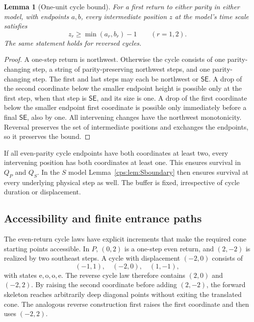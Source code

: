 \documentclass[11pt,letterpaper]{article}
\numberwithin{equation}{section}
\newtheorem{lemma}[theorem]{Lemma}
\theoremstyle{remark}\newtheorem{remark}[theorem]{Remark}
\newcommand{\SE}{\mathsf{SE}}
\newcommand{\e}{\mathrm e}
\newcommand{\oState}{\mathrm o}
\begin{document}
\begin{lemma}[One-unit cycle bound]\label{cps:lem:buffer}
For a first return to either parity in either model, with endpoints $a,b$, every intermediate position $z$ at the model's time scale satisfies
\begin{equation}\label{cps:eq:buffer}
 z_r\ge\min(a_r,b_r)-1\qquad(r=1,2).
\end{equation}
The same statement holds for reversed cycles.
\end{lemma}
\begin{proof}
A one-step return is northwest. Otherwise the cycle consists of one parity-changing step, a string of parity-preserving northwest steps, and one parity-changing step. The first and last steps may each be northwest or $\SE$. A drop of the second coordinate below the smaller endpoint height is possible only at the first step, when that step is $\SE$, and its size is one. A drop of the first coordinate below the smaller endpoint first coordinate is possible only immediately before a final $\SE$, also by one. All intervening changes have the northwest monotonicity. Reversal preserves the set of intermediate positions and exchanges the endpoints, so it preserves the bound.
\end{proof}
If all even-parity cycle endpoints have both coordinates at least two, every intervening position has both coordinates at least one. This ensures survival in $Q_P$ and $Q_S$. In the $S$ model Lemma~\ref{cps:lem:Sboundary} then ensures survival at every underlying physical step as well. The buffer is fixed, irrespective of cycle duration or displacement.

\subsection{Accessibility and finite entrance paths}\label{cps:sec:entrances}
The even-return cycle laws have explicit increments that make the required cone starting points accessible. In $P$, $(0,2)$ is a one-step even return, and $(2,-2)$ is realized by two southeast steps. A cycle with displacement $(-2,0)$ consists of
\begin{equation}
 (-1,1),\quad(-2,0),\quad(1,-1),
\end{equation}
with states $\e,\oState,\oState,\e$. The reverse cycle law therefore contains $(2,0)$ and $(-2,2)$. By raising the second coordinate before adding $(2,-2)$, the forward skeleton reaches arbitrarily deep diagonal points without exiting the translated cone. The analogous reverse construction first raises the first coordinate and then uses $(-2,2)$.
\end{document}
